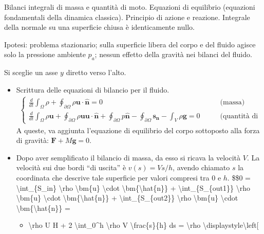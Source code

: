 \documentclass[letterpaper,10pt,italian]{jupyterBook}
\begin{document}
\sphinxAtStartPar
Bilanci integrali di massa e quantità di moto. Equazioni di equilibrio
(equazioni fondamentali della dinamica classica). Principio di azione e
reazione. Integrale della normale su una superficie chiusa è
identicamente nullo.

\sphinxAtStartPar
Ipotesi: problema stazionario; sulla superficie libera del corpo e del
fluido agisce solo la pressione ambiente \(p_a\); nessun effetto della
gravità nei bilanci del fluido.

\sphinxAtStartPar
Si sceglie un asse \(y\) diretto verso l’alto.
\begin{itemize}
\item {} 
\sphinxAtStartPar
Scrittura delle equazioni di bilancio per il fluido.
\begin{equation*}
\begin{split}\begin{cases}
           \frac{d}{d t} \int_{\Omega} \rho + \oint_{\partial \Omega} \rho \bm{u} \cdot \hat{\bm{n}} = 0 & \qquad \text{(massa)} \\
           \frac{d}{d t} \int_{\Omega} \rho \bm{u} + \oint_{\partial \Omega} \rho \bm{u} \bm{u} \cdot \hat{\bm{n}} +
            \oint_{\partial \Omega} p \hat{\bm{n}} - \oint_{\partial \Omega} \bm{s_n} 
            -\int_V \rho \bm{g} = 0  
            & \qquad \text{(quantità di moto)}  %
          \end{cases}\end{split}
\end{equation*}
\sphinxAtStartPar
A queste, va aggiunta l’equazione di equilibrio del corpo sottoposto
alla forza di gravità: \(\bm{F} + M \bm {g} = 0\).

\item {} 
\sphinxAtStartPar
Dopo aver semplificato il bilancio di massa, da esso si ricava la
velocità \(V\). La velocità sui due bordi “di uscita” è
\(v(s) = V s/h\), avendo chiamato \(s\) la coordinata che descrive tale
superficie per valori compresi tra \(0\) e \(h\).
\$\$0 = \textbackslash{}int\_\{S\_in\} \textbackslash{}rho \textbackslash{}bm\{u\} \textbackslash{}cdot \textbackslash{}bm\{\textbackslash{}hat\{n\}\} +   \textbackslash{}int\_\{S\_\{out1\}\} \textbackslash{}rho \textbackslash{}bm\{u\} \textbackslash{}cdot \textbackslash{}bm\{\textbackslash{}hat\{n\}\} +
\textbackslash{}int\_\{S\_\{out2\}\} \textbackslash{}rho \textbackslash{}bm\{u\} \textbackslash{}cdot \textbackslash{}bm\{\textbackslash{}hat\{n\}\} =
\begin{itemize}
\item {} 
\sphinxAtStartPar
\textbackslash{}rho U H + 2 \textbackslash{}int\_0\textasciicircum{}h \textbackslash{}rho V \textbackslash{}frac\{s\}\{h\} ds = \textbackslash{}rho \textbackslash{}displaystyle\textbackslash{}left{[}


\end{itemize}
\end{itemize}
\end{document}
